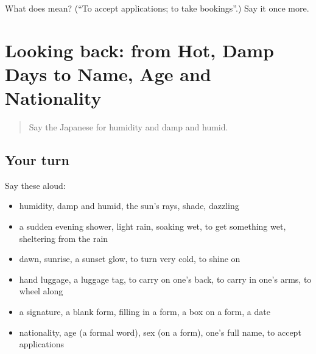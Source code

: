 \begin{tcolorbox}[breakable,colback=teal!4,colframe=teal!35!black,title={Before you move on}]
What does  mean? (\textquotedblleft{}To accept applications; to take bookings\textquotedblright{}.) Say it once more.
\end{tcolorbox}
\section[(dialogue)]{Looking back: from Hot, Damp Days to Name, Age and Nationality}

\label{lesson:JA-R419-review-414-419}



\begin{quote}
Say the Japanese for humidity and damp and humid.
\end{quote}

\subsection*{Your turn}
Say these aloud:

\begin{itemize}
\raggedright
  \item humidity, damp and humid, the sun's rays, shade, dazzling
  \item a sudden evening shower, light rain, soaking wet, to get something wet, sheltering from the rain
  \item dawn, sunrise, a sunset glow, to turn very cold, to shine on
  \item hand luggage, a luggage tag, to carry on one's back, to carry in one's arms, to wheel along
  \item a signature, a blank form, filling in a form, a box on a form, a date
  \item nationality, age (a formal word), sex (on a form), one's full name, to accept applications
\end{itemize}

